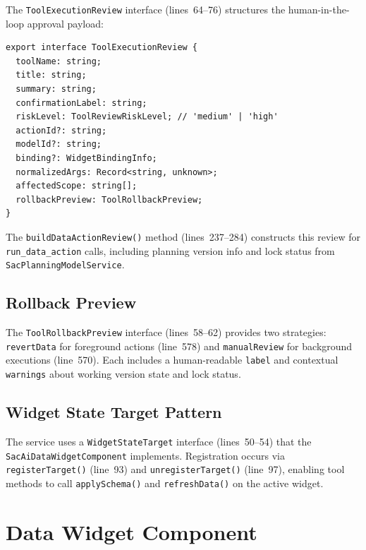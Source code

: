 \documentclass[11pt]{article}
\begin{document}
The \texttt{ToolExecutionReview} interface (lines~64--76) structures the
human-in-the-loop approval payload:

\begin{lstlisting}[language={[Sharp]C},caption={Review interface (sac-tool-dispatch.service.ts:64--76)}]
export interface ToolExecutionReview {
  toolName: string;
  title: string;
  summary: string;
  confirmationLabel: string;
  riskLevel: ToolReviewRiskLevel; // 'medium' | 'high'
  actionId?: string;
  modelId?: string;
  binding?: WidgetBindingInfo;
  normalizedArgs: Record<string, unknown>;
  affectedScope: string[];
  rollbackPreview: ToolRollbackPreview;
}
\end{lstlisting}

\noindent The \texttt{buildDataActionReview()} method (lines~237--284)
constructs this review for \texttt{run\_data\_action} calls, including planning
version info and lock status from \texttt{SacPlanningModelService}.

\subsection{Rollback Preview}

The \texttt{ToolRollbackPreview} interface (lines~58--62) provides two
strategies: \texttt{revertData} for foreground actions (line~578) and
\texttt{manualReview} for background executions (line~570). Each includes a
human-readable \texttt{label} and contextual \texttt{warnings} about working
version state and lock status.

\subsection{Widget State Target Pattern}

The service uses a \texttt{WidgetStateTarget} interface (lines~50--54) that
the \texttt{SacAiDataWidgetComponent} implements. Registration occurs via
\texttt{registerTarget()} (line~93) and \texttt{unregisterTarget()} (line~97),
enabling tool methods to call \texttt{applySchema()} and \texttt{refreshData()}
on the active widget.

\section{Data Widget Component}
\label{sec:datawidget}
\end{document}
